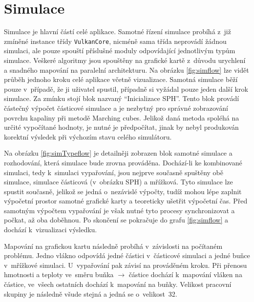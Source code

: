 \section{Simulace}
\label{chapter:simulace}

Simulace je hlavní částí celé aplikace. Samotné řízení simulace probíhá z~již zmíněné instance třídy \texttt{VulkanCore}, nicméně sama třída neprovádí žádnou simulaci, ale pouze spouští příslušné moduly odpovídající jednotlivým typům simulace. Veškeré algoritmy jsou spouštěny na grafické kartě z~důvodu urychlení a snadného mapování na paralelní architekturu. Na obrázku \ref{fig:simflow} lze vidět průběh jednoho kroku celé aplikace včetně vizualizace. Samotná simulace běží pouze v~případě, že ji uživatel spustil, případně si vyžádal pouze jeden další krok simulace. Za zmínku stojí blok nazvaný \enquote{Inicializace SPH}. Tento blok provádí částečný výpočet částicové simulace a je nezbytný pro správné zobrazování povrchu kapaliny při metodě Marching cubes. Jelikož daná metoda spoléhá na určité vypočítané hodnoty, je nutné je předpočítat, jinak by nebyl produkován korektní výsledek při výchozím stavu celého simulátoru.

Na obrázku \ref{fig:simTypeflow} je detailněji zobrazen blok samotné simulace a rozhodování, která simulace bude zrovna prováděna. Dochází-li ke kombinované simulaci, tedy k~simulaci vypařování, jsou nejprve současně spuštěny obě simulace, simulace částicová (v~obrázku SPH) a mřížková. Tyto simulace lze spustit současně, jelikož se jedná o~nezávislé výpočty, tudíž mohou lépe zaplnit výpočetní prostor samotné grafické karty a teoreticky ušetřit výpočetní čas. Před samotným výpočtem vypařování je však nutné tyto procesy synchronizovat a počkat, až oba doběhnou. Po skončení se pokračuje do grafu \ref{fig:simflow} a dochází k~vizualizaci výsledku.

Mapování na grafickou kartu následně probíhá v~závislosti na počítaném problému. Jedno vlákno odpovídá jedné částici v~částicové simulaci a jedné buňce v~mřížkové simulaci. U~vypařování pak závisí na prováděném kroku. Při přenosu hmotnosti a teploty ve~směru buňka $\rightarrow$ částice dochází k~mapování vláken na částice, ve~všech ostatních dochází k~mapování na buňky. Velikost pracovní skupiny je následně všude stejná a jedná se o~velikost~32. 

\newpage

